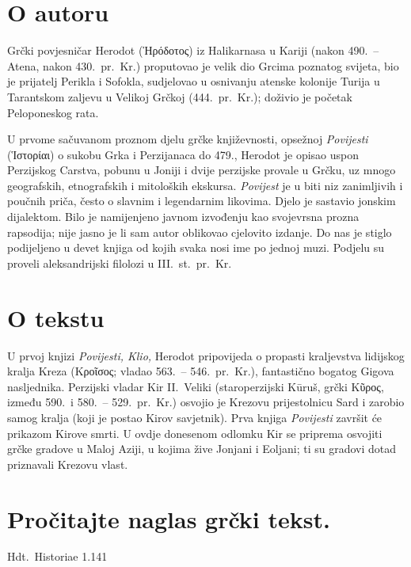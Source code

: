 \section*{O autoru}

Grčki povjesničar Herodot (Ἡρόδοτος) iz Halikarnasa u Kariji (nakon 490.\ – Atena, nakon 430.\ pr.~Kr.) proputovao je velik dio Grcima poznatog svijeta, bio je prijatelj Perikla i Sofokla, sudjelovao u osnivanju atenske kolonije Turija u Tarantskom zaljevu u Velikoj Grčkoj (444.\ pr.~Kr.); doživio je početak Peloponeskog rata.

U prvome sačuvanom proznom djelu grčke književnosti, opsežnoj \textit{Povijesti} (Ἱστορίαι) o sukobu Grka i Perzijanaca do 479., Herodot je opisao uspon Perzijskog Carstva, pobunu u Joniji i dvije perzijske provale u Grčku, uz mnogo geografskih, etnografskih i mitoloških ekskursa. \textit{Povijest} je u biti niz zanimljivih i poučnih priča, često o slavnim i legendarnim likovima. Djelo je sastavio jonskim dijalektom. Bilo je namijenjeno javnom izvođenju kao svojevrsna prozna rapsodija; nije jasno je li sam autor oblikovao cjelovito izdanje. Do nas je stiglo podijeljeno u devet knjiga od kojih svaka nosi ime po jednoj muzi. Podjelu su proveli aleksandrijski filolozi u III.~st.\ pr.~Kr.

\section*{O tekstu}

U prvoj knjizi \textit{Povijesti, Klio,} Herodot pripovijeda o propasti kraljevstva lidijskog kralja Kreza (Κροῖσος; vladao 563.\ – 546.\ pr.~Kr.), fantastično bogatog Gigova nasljednika. Perzijski vladar Kir II.\ Veliki (staroperzijski Kūruš, grčki Κῦρος, između 590.\ i 580.\ – 529.\ pr.~Kr.) osvojio je Krezovu prijestolnicu Sard i zarobio samog kralja (koji je postao Kirov savjetnik). Prva knjiga \textit{Povijesti} završit će prikazom Kirove smrti. U ovdje donesenom odlomku Kir se priprema osvojiti grčke gradove u Maloj Aziji, u kojima žive Jonjani i Eoljani; ti su gradovi dotad priznavali Krezovu vlast.


\section*{Pročitajte naglas grčki tekst.}

Hdt.\ Historiae 1.141

